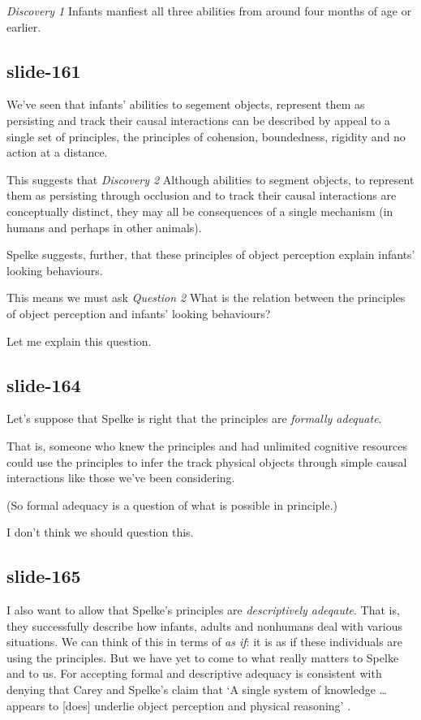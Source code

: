 \documentclass[12pt,\papersize]{extarticle}
\begin{document}
\emph{Discovery 1} Infants manfiest all three abilities from around four months of age or earlier.
 
\subsection{slide-161}
We've seen that infants' abilities to segement objects, represent them as persisting and track their causal 
interactions can be described by appeal to a single set of principles, 
the principles of cohension, boundedness, rigidity and no action at a distance.
 
This suggests that 
\emph{Discovery 2} Although abilities to segment objects, to represent them as persisting through occlusion and  to track their causal interactions are conceptually distinct, they may all be consequences of a single mechanism (in humans and perhaps in other animals).
 
Spelke suggests, further, that these principles of object perception explain infants' looking behaviours.
 
This means we must ask
\emph{Question 2} What is the relation between the principles of object perception and infants’ looking behaviours?
 
Let me explain this question.
 
\subsection{slide-164}
Let's suppose that Spelke is right that the principles are \emph{formally adequate}.
 
That is, someone who knew the principles and had unlimited cognitive resources could use the principles to infer the track physical objects through simple causal interactions like those we've been considering.
 
(So formal adequacy is a question of what is possible in principle.)
 
I don't think we should question this.
 
\subsection{slide-165}
I also want to allow that Spelke's principles are \emph{descriptively adeqaute}.
That is, they successfully describe how infants, adults and nonhumans deal with various situations.
We can think of this in terms of \emph{as if}: it is as if these individuals are using the principles.
But we have yet to come to what really matters to Spelke and to us.
For accepting formal and descriptive adequacy is consistent with denying that Carey and Spelke's claim that ‘A single system of knowledge … appears to [does] underlie object perception and physical reasoning’ \citep[p.\ 175]{Carey:1994bh}.
 
\end{document}
